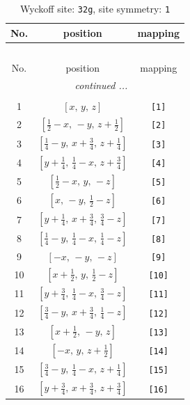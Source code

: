 \documentclass[fleqn,8pt]{jsarticle}
\begin{document}
\begin{longtable}{ccc}
\caption{Wyckoff site: {\tt 32g}, site symmetry: {\tt 1}}
 \\
 \hline \hline
No. & position & mapping \\ \hline \endfirsthead

\multicolumn{2}{l}{\tablename\ \thetable{}} \\
 \hline \hline
No. & position & mapping \\ \hline \endhead

 \hline \hline
\multicolumn{2}{r}{\footnotesize\it continued ...} \\ \endfoot

 \hline \hline
\multicolumn{2}{r}{} \\ \endlastfoot

1 & $\left[ x,\, y,\, z \right]$ & {\tt [1]} \\ \hline
2 & $\left[ \frac{1}{2} - x,\, - y,\, z + \frac{1}{2} \right]$ & {\tt [2]} \\ \hline
3 & $\left[ \frac{1}{4} - y,\, x + \frac{3}{4},\, z + \frac{1}{4} \right]$ & {\tt [3]} \\ \hline
4 & $\left[ y + \frac{1}{4},\, \frac{1}{4} - x,\, z + \frac{3}{4} \right]$ & {\tt [4]} \\ \hline
5 & $\left[ \frac{1}{2} - x,\, y,\, - z \right]$ & {\tt [5]} \\ \hline
6 & $\left[ x,\, - y,\, \frac{1}{2} - z \right]$ & {\tt [6]} \\ \hline
7 & $\left[ y + \frac{1}{4},\, x + \frac{3}{4},\, \frac{3}{4} - z \right]$ & {\tt [7]} \\ \hline
8 & $\left[ \frac{1}{4} - y,\, \frac{1}{4} - x,\, \frac{1}{4} - z \right]$ & {\tt [8]} \\ \hline
9 & $\left[ - x,\, - y,\, - z \right]$ & {\tt [9]} \\ \hline
10 & $\left[ x + \frac{1}{2},\, y,\, \frac{1}{2} - z \right]$ & {\tt [10]} \\ \hline
11 & $\left[ y + \frac{3}{4},\, \frac{1}{4} - x,\, \frac{3}{4} - z \right]$ & {\tt [11]} \\ \hline
12 & $\left[ \frac{3}{4} - y,\, x + \frac{3}{4},\, \frac{1}{4} - z \right]$ & {\tt [12]} \\ \hline
13 & $\left[ x + \frac{1}{2},\, - y,\, z \right]$ & {\tt [13]} \\ \hline
14 & $\left[ - x,\, y,\, z + \frac{1}{2} \right]$ & {\tt [14]} \\ \hline
15 & $\left[ \frac{3}{4} - y,\, \frac{1}{4} - x,\, z + \frac{1}{4} \right]$ & {\tt [15]} \\ \hline
16 & $\left[ y + \frac{3}{4},\, x + \frac{3}{4},\, z + \frac{3}{4} \right]$ & {\tt [16]} \\
\end{longtable}
\end{document}
